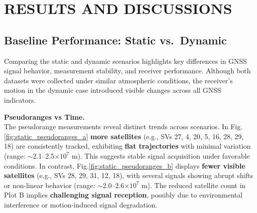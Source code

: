 
\section{RESULTS AND DISCUSSIONS} \label{sec:results}

    \subsection{Baseline Performance: Static vs.\ Dynamic}

        Comparing the static and dynamic scenarios highlights key differences in GNSS signal behavior, measurement stability, and receiver performance. 
        Although both datasets were collected under similar atmospheric conditions, the receiver's motion in the dynamic case introduced visible changes across all GNSS indicators.
    
        \vspace{0.5em}
        \noindent\textbf{Pseudoranges vs Time.} 
        \\The pseudorange measurements reveal distinct trends across scenarios. In Fig. \ref{fig:static_pseudoranges_a} \textbf{more satellites} (e.g., SVs 27, 4, 20, 5, 16, 28, 29, 18) are consistently tracked, exhibiting \textbf{flat trajectories} with minimal variation (range: $\sim$2.1--2.5$\times 10^7$ m). This suggests stable signal acquisition under favorable conditions. In contrast, Fig.\ref{fig:static_pseudoranges_b} displays \textbf{fewer visible satellites} (e.g., SVs 28, 29, 31, 12, 18), with several signals showing abrupt shifts or non-linear behavior (range: $\sim$2.0--2.6$\times 10^7$ m). The reduced satellite count in Plot B implies \textbf{challenging signal reception}, possibly due to environmental interference or motion-induced signal degradation.  


